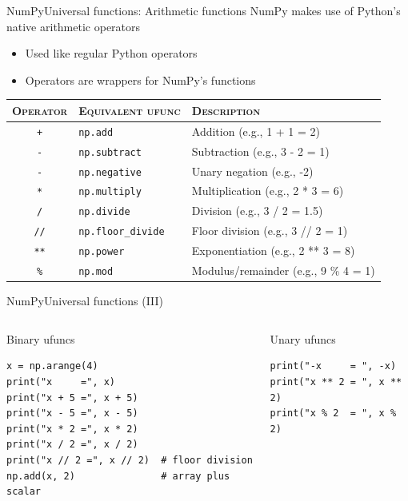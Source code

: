 \documentclass[10pt,compress]{beamer} %
\begin{document}
\begin{frame}{NumPy}{Universal functions: Arithmetic functions}
	NumPy makes use of Python's native arithmetic operators
	\begin{itemize}
		\item Used like regular Python operators
		\item Operators are wrappers for NumPy's functions
	\end{itemize}

	\bigskip

	\footnotesize{
    \begin{tabular}{cll}\hline
       \textsc{Operator} & \textsc{Equivalent ufunc} & \textsc{Description}\\ \hline
	   \texttt{+} & \texttt{np.add} & Addition (e.g., 1 + 1 = 2) \\
	   \texttt{-} & \texttt{np.subtract} & Subtraction (e.g., 3 - 2 = 1)\\
	   \texttt{-} & \texttt{np.negative} & Unary negation (e.g., -2)\\
	   \texttt{*} & \texttt{np.multiply} & Multiplication (e.g., 2 * 3 = 6)\\
	   \texttt{/} & \texttt{np.divide} & Division (e.g., 3 / 2 = 1.5)\\
	   \texttt{//} & \texttt{np.floor\_divide} & Floor division (e.g., 3 // 2 = 1) \\
	   \texttt{**} & \texttt{np.power} & Exponentiation (e.g., 2 ** 3 = 8)\\
	   \texttt{\%} & \texttt{np.mod} & Modulus/remainder (e.g., 9 \% 4 = 1) \\\hline
    \end{tabular}
	}
\end{frame}

\begin{frame}[fragile]{NumPy}{Universal functions (III)}
	\vspace{-0.2cm} 
	\begin{columns}
		\begin{exampleblock}{\footnotesize{Binary ufuncs}}
		\vspace{-0.2cm} 
			\begin{lstlisting}
x = np.arange(4)
print("x     =", x)
print("x + 5 =", x + 5)
print("x - 5 =", x - 5)
print("x * 2 =", x * 2)
print("x / 2 =", x / 2)
print("x // 2 =", x // 2)  # floor division
np.add(x, 2)               # array plus scalar
			\end{lstlisting}
		\vspace{-0.2cm} 
		\end{exampleblock}

		\begin{exampleblock}{\footnotesize{Unary ufuncs}}
		\vspace{-0.2cm} 
			\begin{lstlisting}
print("-x     = ", -x)
print("x ** 2 = ", x ** 2)
print("x % 2  = ", x % 2)
			\end{lstlisting}
		\vspace{-0.2cm} 
		\end{exampleblock}
	\end{columns}
\end{frame}
\end{document}
